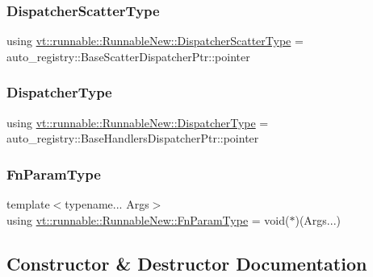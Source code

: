 \subsubsection{\texorpdfstring{Dispatcher\+Scatter\+Type}{DispatcherScatterType}}
{\footnotesize\ttfamily using \hyperlink{structvt_1_1runnable_1_1_runnable_new_a1e5173d3a71a30f4901c61b7de4092c6}{vt\+::runnable\+::\+Runnable\+New\+::\+Dispatcher\+Scatter\+Type} =  auto\+\_\+registry\+::\+Base\+Scatter\+Dispatcher\+Ptr\+::pointer}

\mbox{\label{structvt_1_1runnable_1_1_runnable_new_ad0cb55d8e34960ef9dd139638cb721cd}} 
\subsubsection{\texorpdfstring{Dispatcher\+Type}{DispatcherType}}
{\footnotesize\ttfamily using \hyperlink{structvt_1_1runnable_1_1_runnable_new_ad0cb55d8e34960ef9dd139638cb721cd}{vt\+::runnable\+::\+Runnable\+New\+::\+Dispatcher\+Type} =  auto\+\_\+registry\+::\+Base\+Handlers\+Dispatcher\+Ptr\+::pointer}

\mbox{\label{structvt_1_1runnable_1_1_runnable_new_a591a5eaee30eea99711e14e050633d34}} 
\subsubsection{\texorpdfstring{Fn\+Param\+Type}{FnParamType}}
{\footnotesize\ttfamily template$<$typename... Args$>$ \\
using \hyperlink{structvt_1_1runnable_1_1_runnable_new_a591a5eaee30eea99711e14e050633d34}{vt\+::runnable\+::\+Runnable\+New\+::\+Fn\+Param\+Type} =  void($\ast$)(Args...)}



\subsection{Constructor \& Destructor Documentation}
\mbox{\label{structvt_1_1runnable_1_1_runnable_new_a89c5a19ee5a150199c46801c876d39e7}} 
